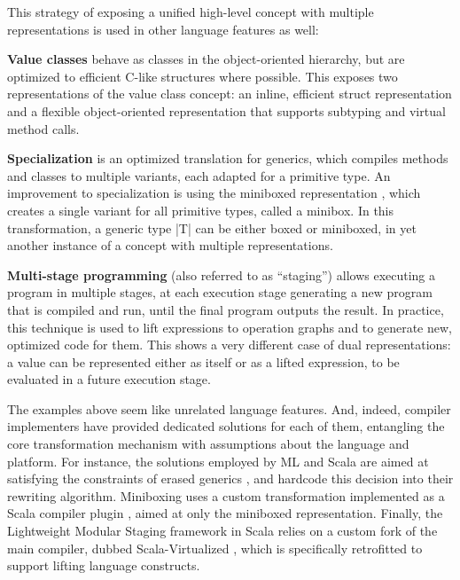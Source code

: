 This strategy of exposing a unified high-level concept with multiple representations is used in other language features as well:

\textbf{Value classes} \cite{gosling-value-classes, dot-net-value-types-www, sip-value-classes} behave as classes in the object-oriented hierarchy, but are optimized to efficient C-like structures \cite{cxx-stroustrup} where possible. This exposes two representations of the value class concept: an inline, efficient struct representation and a flexible object-oriented representation that supports subtyping and virtual method calls.

\textbf{Specialization} \cite{specialization-iuli, iuli-thesis, goetz-specialization} is an optimized translation for generics, which compiles methods and classes to multiple variants, each adapted for a primitive type. An improvement to specialization is using the miniboxed representation \cite{miniboxing, miniboxing-www}, which creates a single variant for all primitive types, called a minibox. In this transformation, a generic type |T| can be either boxed or miniboxed, in yet another instance of a concept with multiple representations.

\textbf{Multi-stage programming} (also referred to as ``staging'') \cite{taha-intro} allows executing a program in multiple stages, at each execution stage generating a new program that is compiled and run, until the final program outputs the result. In practice, this technique is used to lift expressions to operation graphs and to generate new, optimized code for them. This shows a very different case of dual representations: a value can be represented either as itself or as a lifted expression, to be evaluated in a future execution stage.

The examples above seem like unrelated language features. And, indeed, compiler implementers have provided dedicated solutions for each of them, entangling the core transformation mechanism with assumptions about the language and platform. For instance, the solutions employed by ML and Scala are aimed at satisfying the constraints of erased generics \cite{java-erasure, leroy-unboxed-objects, thiemann-unboxed-objects-cps}, and hardcode this decision into their rewriting algorithm. Miniboxing uses a custom transformation implemented as a Scala compiler plugin \cite{miniboxing, miniboxing-www}, aimed at only the miniboxed representation. Finally, the Lightweight Modular Staging framework \cite{tiark-lms} in Scala relies on a custom fork of the main compiler, dubbed Scala-Virtualized \cite{scala-virtualized}, which is specifically retrofitted to support lifting language constructs.

